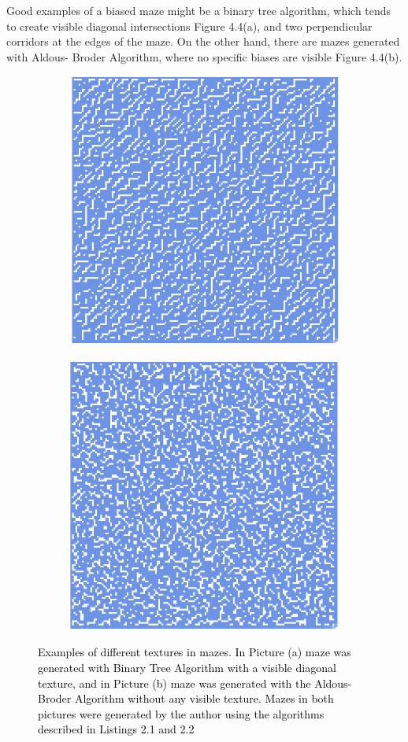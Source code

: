 Good examples of a biased maze might be a binary tree algorithm, which tends to create visible diagonal intersections Figure 4.4(a), and two perpendicular corridors at the edges of the maze. On the other hand, there are mazes generated with Aldous- Broder Algorithm, where no specific biases are visible Figure 4.4(b).
\newline
\begin{figure}[!h]
    \centering
    \begin{subfigure}{.5\textwidth}
    \centering
    \includegraphics[width=.5\linewidth]{binarybias}
    \caption{}
    \label{fig:sub1}
    \end{subfigure}%
    \begin{subfigure}{.5\textwidth}
    \centering
    \includegraphics[width=.5\linewidth]{aldousbias}
    \caption{}
    \label{fig:sub2}
    \end{subfigure}
    \caption{\textcolor{black}{Examples of different textures in mazes. In Picture (a) maze was generated with  Binary Tree Algorithm with a visible diagonal texture, and in Picture (b) maze was generated with the Aldous-Broder Algorithm without any visible texture. Mazes in both pictures were generated by the author using the algorithms described in Listings 2.1 and 2.2}}
    \label{fig:test}
    \end{figure}
